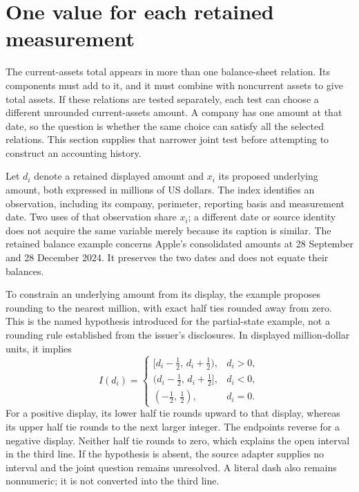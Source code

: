 \section{One value for each retained measurement}
\label{sec:joint-source-measurements}

The current-assets total appears in more than one balance-sheet relation.
Its components must add to it, and it must combine with noncurrent assets
to give total assets. If these relations are tested separately, each test
can choose a different unrounded current-assets amount. A company has one
amount at that date, so the question is whether the same choice can satisfy
all the selected relations. This section supplies that narrower joint test
before attempting to construct an accounting history.

Let \(d_i\) denote a retained displayed amount and \(x_i\) its proposed
underlying amount, both expressed in millions of US dollars. The index
identifies an observation, including its company, perimeter, reporting basis
and measurement date. Two uses of that observation share \(x_i\); a
different date or source identity does not acquire the same variable merely
because its caption is similar. The retained balance example concerns
Apple's consolidated amounts at 28 September and 28 December 2024. It
preserves the two dates and does not equate their balances.

To constrain an underlying amount from its display, the example proposes
rounding to the nearest million, with exact half ties rounded away from
zero. This is the named hypothesis introduced for the partial-state example,
not a rounding rule established from the issuer's disclosures. In displayed
million-dollar units, it implies
\begin{equation}
\label{eq:joint-source-signed-rounding}
 I(d_i)=
 \begin{cases}
 [d_i-\tfrac12,\,d_i+\tfrac12), & d_i>0,\\
 (d_i-\tfrac12,\,d_i+\tfrac12], & d_i<0,\\
 (-\tfrac12,\,\tfrac12), & d_i=0.
 \end{cases}
\end{equation}
For a positive display, its lower half tie rounds upward to that display,
whereas its upper half tie rounds to the next larger integer. The endpoints
reverse for a negative display. Neither half tie rounds to zero, which
explains the open interval in the third line. If the hypothesis is absent,
the source adapter supplies no interval and the joint question remains
unresolved. A literal dash also remains nonnumeric; it is not converted into
the third line.

